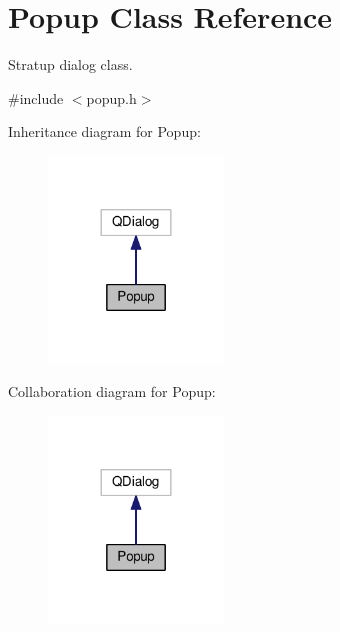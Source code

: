 \hypertarget{classPopup}{}\section{Popup Class Reference}
\label{classPopup}


Stratup dialog class.  




{\ttfamily \#include $<$popup.\+h$>$}



Inheritance diagram for Popup\+:
\nopagebreak
\begin{figure}[H]
\begin{center}
\leavevmode
\includegraphics[width=132pt]{d3/dac/classPopup__inherit__graph}
\end{center}
\end{figure}


Collaboration diagram for Popup\+:
\nopagebreak
\begin{figure}[H]
\begin{center}
\leavevmode
\includegraphics[width=132pt]{d2/dba/classPopup__coll__graph}
\end{center}
\end{figure}
